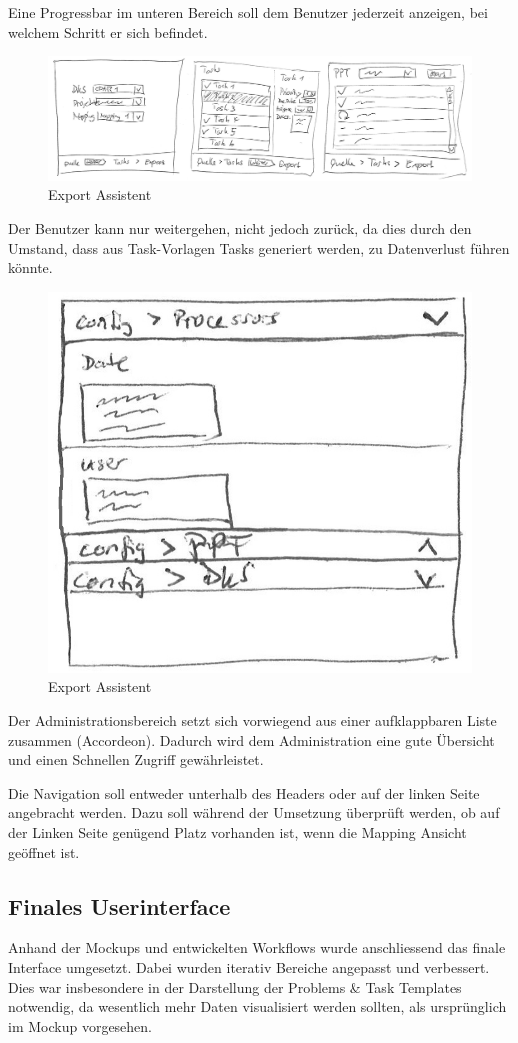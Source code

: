 		Eine Progressbar im unteren Bereich soll dem Benutzer jederzeit anzeigen, bei welchem Schritt er sich befindet.
		
		\begin{figure}[H]
			\includegraphics[width=\linewidth]{interfacesAndProtocols/media/img/exportWorkflow.jpg}
			\caption{Export Assistent}
			\label{fig:exportAssistent}
		\end{figure}	
		
		Der Benutzer kann nur weitergehen, nicht jedoch zurück, da dies durch den Umstand, 
		dass aus Task-Vorlagen Tasks generiert werden, 
		zu Datenverlust führen könnte.
		
		\begin{figure}[H]
			\centering
			\includegraphics[width=0.3\linewidth]{interfacesAndProtocols/media/img/administration.jpg}
			\caption{Export Assistent}
			\label{fig:administration}
		\end{figure}	
		
		Der Administrationsbereich setzt sich vorwiegend aus einer aufklappbaren Liste zusammen (Accordeon). Dadurch wird dem Administration eine gute Übersicht und einen Schnellen Zugriff gewährleistet.
		
		Die Navigation soll entweder unterhalb des Headers oder auf der linken Seite angebracht werden. Dazu soll während der Umsetzung überprüft werden, ob auf der Linken Seite genügend Platz vorhanden ist, wenn die Mapping Ansicht geöffnet ist.
		
		
	\subsection{Finales Userinterface}
	
		Anhand der Mockups und entwickelten Workflows wurde anschliessend das finale Interface umgesetzt.
		Dabei wurden iterativ Bereiche angepasst und verbessert.
		Dies war insbesondere in der Darstellung der Problems \& Task Templates notwendig, 
		da wesentlich mehr Daten visualisiert werden sollten, als ursprünglich im Mockup vorgesehen.
		
